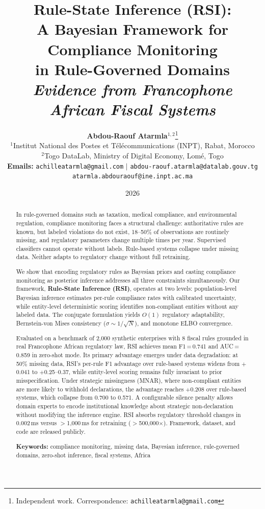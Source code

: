 \documentclass[letterpaper]{article}
\title{%
\textbf{Rule-State Inference (RSI):}\\
\textbf{A Bayesian Framework for Compliance Monitoring}\\
\textbf{in Rule-Governed Domains}\\[0.4em]
\large\textit{Evidence from Francophone African Fiscal Systems}
}
\author{
    \textbf{Abdou-Raouf Atarmla}$^{1,2}$\thanks{Independent work. Correspondence: \texttt{achilleatarmla@gmail.com}} \\
    \small $^{1}$Institut National des Postes et T\'el\'ecommunications (INPT), Rabat, Morocco \\
    \small $^{2}$Togo DataLab, Ministry of Digital Economy, Lom\'e, Togo \\
    \small \textbf{Emails:} \texttt{achilleatarmla@gmail.com} $|$ \texttt{abdou-raouf.atarmla@datalab.gouv.tg} \\
    \small \texttt{atarmla.abdouraouf@ine.inpt.ac.ma}
}
\date{2026}
\begin{document}
\maketitle
\thispagestyle{empty}

\begin{abstract}
\noindent
In rule-governed domains such as taxation, medical compliance, and
environmental regulation, compliance monitoring faces a structural
challenge: authoritative rules are known, but labeled violations do
not exist, 18--50\% of observations are routinely missing, and
regulatory parameters change multiple times per year. Supervised
classifiers cannot operate without labels. Rule-based systems collapse
under missing data. Neither adapts to regulatory change without full
retraining.

We show that encoding regulatory rules as Bayesian priors and casting
compliance monitoring as posterior inference addresses all three
constraints simultaneously. Our framework, \textbf{Rule-State
Inference (RSI)}, operates at two levels: population-level Bayesian
inference estimates per-rule compliance rates with calibrated
uncertainty, while entity-level deterministic scoring identifies
non-compliant entities without any labeled data. The conjugate
formulation yields $O(1)$ regulatory adaptability,
Bernstein-von Mises consistency ($\sigma \sim 1/\sqrt{N}$), and
monotone ELBO convergence.

Evaluated on a benchmark of 2{,}000 synthetic enterprises with 8
fiscal rules grounded in real Francophone African regulatory law, RSI
achieves mean F1\,=\,0.741 and AUC\,=\,0.859 in zero-shot mode.
Its primary advantage emerges under data degradation: at 50\% missing
data, RSI's per-rule F1 advantage over rule-based systems widens from
$+$0.041 to $+$0.25--0.37, while entity-level scoring remains fully
invariant to prior misspecification. Under strategic missingness
(MNAR), where non-compliant entities are more likely to withhold
declarations, the advantage reaches $+$0.208 over rule-based systems,
which collapse from 0.700 to 0.571. A configurable silence penalty
allows domain experts to encode institutional knowledge about
strategic non-declaration without modifying the inference engine.
RSI absorbs regulatory threshold changes in 0.002\,ms versus
$>$1{,}000\,ms for retraining ($>$500{,}000$\times$). Framework,
dataset, and code are released publicly.

\medskip
\noindent\textbf{Keywords:} compliance monitoring, missing data,
Bayesian inference, rule-governed domains, zero-shot inference,
fiscal systems, Africa
\end{abstract}
\end{document}
